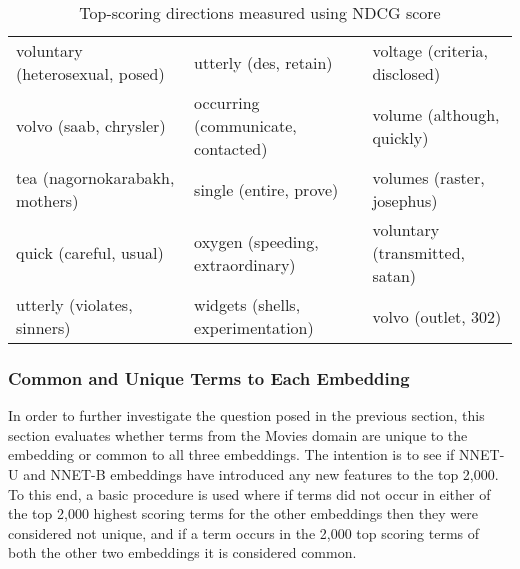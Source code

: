 \begin{table}[]
\begin{tabular}{lll}
		voluntary (heterosexual, posed)          & utterly (des, retain)                             & voltage (criteria, disclosed)                            \\
		volvo (saab, chrysler)                   & occurring (communicate, contacted)                & volume (although, quickly)                               \\
		tea (nagornokarabakh, mothers)           & single (entire, prove)                            & volumes (raster, josephus)                               \\
		quick (careful, usual)                   & oxygen (speeding, extraordinary)                  & voluntary (transmitted, satan)                           \\
		utterly (violates, sinners)              & widgets (shells, experimentation)                 & volvo (outlet, 302)                                     
	\end{tabular}\caption{Top-scoring directions measured using NDCG score}\label{ch5:topscores}
\end{table}

\subsubsection{Common and Unique Terms to Each Embedding}\label{ch5:commonunique}

In order to further investigate the question posed in the previous section, this section evaluates whether terms from the Movies domain are unique to the embedding or common to all three embeddings. The intention is to see if NNET-U and NNET-B embeddings have introduced any new features to the top 2,000. To this end,  a basic procedure is used  where if terms did not occur in either of the top 2,000 highest scoring terms for the other embeddings then they were considered not unique, and if a term  occurs in the 2,000 top scoring terms of both the other two embeddings it is considered common. 

